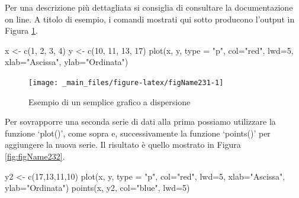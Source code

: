 \documentclass[a4paper,12pt,oneside]{book}
\newenvironment{Shaded}{}{}
\newcommand{\KeywordTok}[1]{#1}
\newcommand{\DataTypeTok}[1]{#1}
\newcommand{\DecValTok}[1]{#1}
\newcommand{\StringTok}[1]{#1}
\newcommand{\NormalTok}[1]{#1}
\begin{document}
Per una descrizione più dettagliata si consiglia di consultare la documentazione on line. A titolo di esempio, i comandi mostrati qui sotto producono l'output in Figura \ref{fig:figName231}.

\begin{Shaded}
\begin{Highlighting}[]
\NormalTok{x  <-}\StringTok{  }\KeywordTok{c}\NormalTok{(}\DecValTok{1}\NormalTok{, }\DecValTok{2}\NormalTok{, }\DecValTok{3}\NormalTok{, }\DecValTok{4}\NormalTok{)}
\NormalTok{y  <-}\StringTok{  }\KeywordTok{c}\NormalTok{(}\DecValTok{10}\NormalTok{, }\DecValTok{11}\NormalTok{, }\DecValTok{13}\NormalTok{, }\DecValTok{17}\NormalTok{)}
\KeywordTok{plot}\NormalTok{(x, y, }\DataTypeTok{type =} \StringTok{"p"}\NormalTok{, }\DataTypeTok{col=}\StringTok{"red"}\NormalTok{, }\DataTypeTok{lwd=}\DecValTok{5}\NormalTok{, }\DataTypeTok{xlab=}\StringTok{"Ascissa"}\NormalTok{, }\DataTypeTok{ylab=}\StringTok{"Ordinata"}\NormalTok{)}
\end{Highlighting}
\end{Shaded}

\begin{figure}

{\centering \texttt{[image: \_main\_files/figure-latex/figName231-1]} 

}

\caption{Esempio di un semplice grafico a dispersione}\label{fig:figName231}
\end{figure}

Per sovrapporre una seconda serie di dati alla prima possiamo utilizzare la funzione `plot()', come sopra e, successivamente la funzione `points()' per aggiungere la nuova serie. Il risultato è quello mostrato in Figura \ref{fig:figName232}.

\begin{Shaded}
\begin{Highlighting}[]
\NormalTok{y2  <-}\StringTok{  }\KeywordTok{c}\NormalTok{(}\DecValTok{17}\NormalTok{,}\DecValTok{13}\NormalTok{,}\DecValTok{11}\NormalTok{,}\DecValTok{10}\NormalTok{)}
\KeywordTok{plot}\NormalTok{(x, y, }\DataTypeTok{type =} \StringTok{"p"}\NormalTok{, }\DataTypeTok{col=}\StringTok{"red"}\NormalTok{, }\DataTypeTok{lwd=}\DecValTok{5}\NormalTok{, }\DataTypeTok{xlab=}\StringTok{"Ascissa"}\NormalTok{, }\DataTypeTok{ylab=}\StringTok{"Ordinata"}\NormalTok{)}
\KeywordTok{points}\NormalTok{(x, y2, }\DataTypeTok{col=}\StringTok{"blue"}\NormalTok{, }\DataTypeTok{lwd=}\DecValTok{5}\NormalTok{)}
\end{Highlighting}
\end{Shaded}
\end{document}
